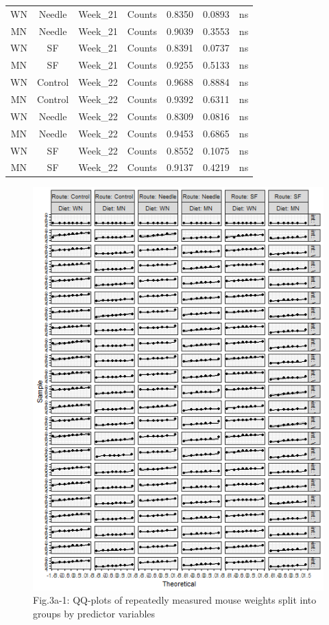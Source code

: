 \documentclass[
  12pt,
  letterpaper,
]{article}
\begin{document}
\begin{longtable}{ccclrrl}
WN & Needle & Week\_21 & Counts & 0.8350 & 0.0893 & ns \\ 
MN & Needle & Week\_21 & Counts & 0.9039 & 0.3553 & ns \\ 
WN & SF & Week\_21 & Counts & 0.8391 & 0.0737 & ns \\ 
MN & SF & Week\_21 & Counts & 0.9255 & 0.5133 & ns \\ 
WN & Control & Week\_22 & Counts & 0.9688 & 0.8884 & ns \\ 
MN & Control & Week\_22 & Counts & 0.9392 & 0.6311 & ns \\ 
WN & Needle & Week\_22 & Counts & 0.8309 & 0.0816 & ns \\ 
MN & Needle & Week\_22 & Counts & 0.9453 & 0.6865 & ns \\ 
WN & SF & Week\_22 & Counts & 0.8552 & 0.1075 & ns \\ 
MN & SF & Week\_22 & Counts & 0.9137 & 0.4219 & ns \\ 
\bottomrule
\end{longtable}
\endgroup

\begin{figure}[H]

{\centering \includegraphics[width=0.95\linewidth,]{Statistics_Report_files/figure-latex/qq-plot-figure-3a-1} 

}

\caption{Fig.3a-1: QQ-plots of repeatedly measured mouse weights split into groups by predictor variables}\label{fig:qq-plot-figure-3a}
\end{figure}
\end{document}
